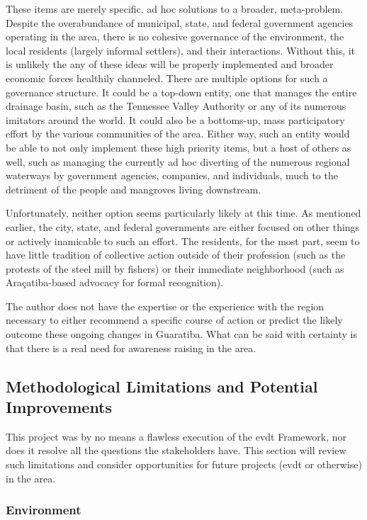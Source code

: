 These items are merely specific, ad hoc solutions to a broader, meta-problem. Despite the overabundance of municipal, state, and federal government agencies operating in the area, there is no cohesive governance of the environment, the local residents (largely informal settlers), and their interactions. Without this, it is unlikely the any of these ideas will be properly implemented and broader economic forces healthily channeled. There are multiple options for such a governance structure. It could be a top-down entity, one that manages the entire drainage basin, such as the Tennessee Valley Authority or any of its numerous imitators around the world. It could also be a bottoms-up, mass participatory effort by the various communities of the area. Either way, such an entity would be able to not only implement these high priority items, but a host of others as well, such as managing the currently ad hoc diverting of the numerous regional waterways by government agencies, companies, and individuals, much to the detriment of the people and mangroves living downstream.

Unfortunately, neither option seems particularly likely at this time. As mentioned earlier, the city, state, and federal governments are either focused on other things or actively inamicable to such an effort. The residents, for the most part, seem to have little tradition of collective action outside of their profession (such as the protests of the steel mill by fishers) or their immediate neighborhood (such as Araçatiba-based advocacy for formal recognition). 

The author does not have the expertise or the experience with the region necessary to either recommend a specific course of action or predict the likely outcome these ongoing changes in Guaratiba. What can be said with certainty is that there is a real need for awareness raising in the area.

\subsection{Methodological Limitations and Potential Improvements} \label{sec:rio-limitations}

This project was by no means a flawless execution of the \ac{evdt} Framework, nor does it resolve all the questions the stakeholders have. This section will review such limitations and consider opportunities for future projects (\ac{evdt} or otherwise) in the area. 

\subsubsection{Environment}

